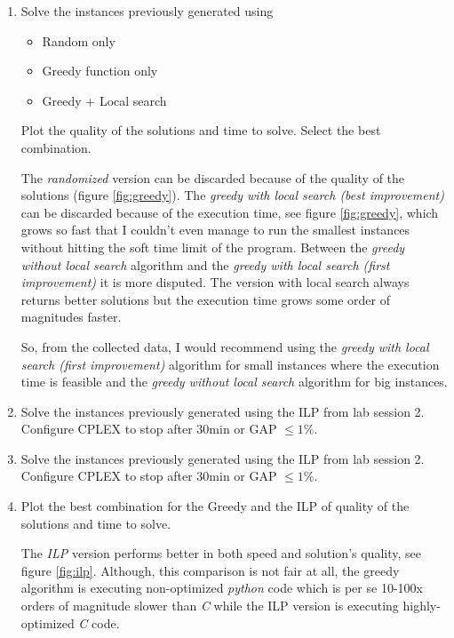 \documentclass[12pt, a4paper]{article}
\begin{document}
\begin{enumerate}[label=(\alph*)]
    \item[\textcolor{QuestionBlue}{\textbullet}]{\color{QuestionBlue}
      Solve the instances previously generated using

        \begin{itemize}
            \item Random only
            \item Greedy function only
            \item Greedy + Local search
        \end{itemize}

      Plot the quality of the solutions and time to solve. Select the best combination.
    }

    The \textit{randomized} version can be discarded because of the quality of the solutions (figure \ref{fig:greedy}).
    The \textit{greedy with local search (best improvement)} can be discarded because of the execution time, see figure \ref{fig:greedy}, which grows so fast that I couldn't even manage to run the smallest instances without hitting the soft time limit of the program.
    Between the \textit{greedy without local search} algorithm and the \textit{greedy with local search (first improvement)} it is more disputed.
    The version with local search always returns better solutions but the execution time grows some order of magnitudes faster.

    So, from the collected data, I would recommend using the \textit{greedy with local search (first improvement)} algorithm for small instances where the execution time is feasible and the \textit{greedy without local search} algorithm for big instances.

    \item Solve the instances previously generated using the ILP from lab session 2.
    Configure CPLEX to stop after 30min or GAP $\le 1\%$.

    \item[\textcolor{QuestionBlue}{\textbullet}] \textcolor{QuestionBlue}{
      Solve the instances previously generated using the ILP from lab session 2.
      Configure CPLEX to stop after 30min or GAP $\le 1\%$.
    }

    \item[\textcolor{QuestionBlue}{\textbullet}] \textcolor{QuestionBlue}{Plot the best combination for the Greedy and the ILP of quality of the solutions and time to solve.}

    The \textit{ILP} version performs better in both speed and solution's quality, see figure \ref{fig:ilp}. Although, this comparison is not fair at all,
    the greedy algorithm is executing non-optimized \textit{python} code which is per se 10-100x orders of magnitude slower than \textit{C} while the ILP version is executing
    highly-optimized \textit{C} code.


\end{enumerate}
\end{document}
